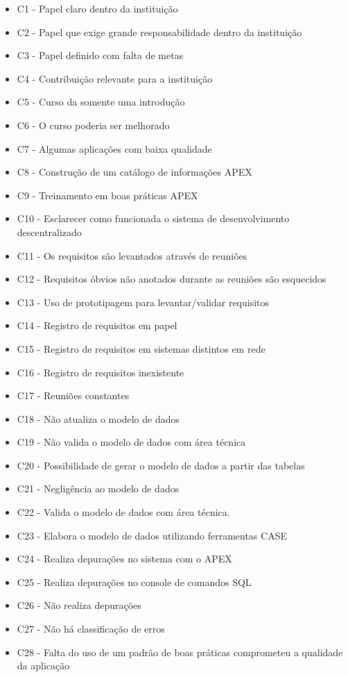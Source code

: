 \begin{itemize}
\item C1 - Papel claro dentro da instituição
\item C2 - Papel que exige grande responsabilidade dentro da instituição
\item C3 - Papel definido com falta de metas
\item C4 - Contribuição relevante para a instituição
\item C5 - Curso da somente uma introdução
\item C6 - O curso poderia ser melhorado
\item C7 - Algumas aplicações com baixa qualidade
\item C8 - Construção de um catálogo de informações APEX
\item C9 - Treinamento em boas práticas APEX
\item C10 - Esclarecer como funcionada o sistema de desenvolvimento descentralizado
\item C11 - Os requisitos são levantados através de reuniões
\item C12 - Requisitos óbvios não anotados durante as reuniões são esquecidos
\item C13 - Uso de prototipagem para levantar/validar requisitos
\item C14 - Registro de requisitos em papel
\item C15 - Registro de requisitos em sistemas distintos em rede
\item C16 - Registro de requisitos inexistente
\item C17 - Reuniões constantes
\item C18 - Não atualiza o modelo de dados
\item C19 - Não valida o modelo de dados com área técnica
\item C20 - Possibilidade de gerar o modelo de dados a partir das tabelas
\item C21 - Negligência ao modelo de dados
\item C22 - Valida o modelo de dados com área técnica.
\item C23 - Elabora o modelo de dados utilizando ferramentas CASE
\item C24 - Realiza depurações no sistema com o APEX
\item C25 - Realiza depurações no console de comandos SQL
\item C26 - Não realiza depurações
\item C27 - Não há classificação de erros
\item C28 - Falta do uso de um padrão de boas práticas comprometeu a qualidade da aplicação

\end{itemize}
